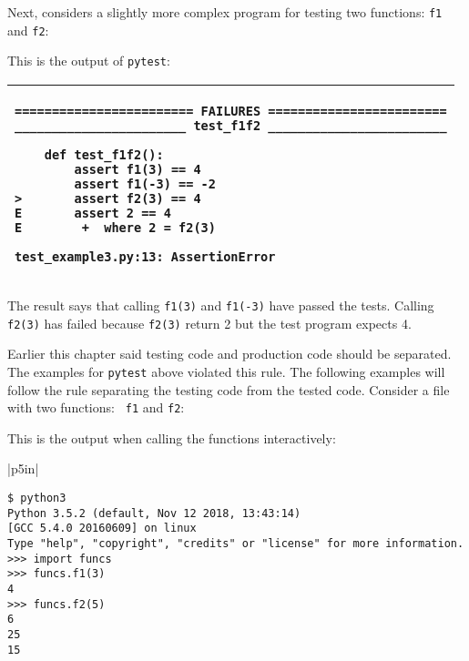 Next, considers a slightly more complex program for testing two
functions: {\tt f1} and {\tt f2}:

\resetlinenumber[1]
\linenumbers
\begin{tt}
  
\end{tt}
\nolinenumbers

This is the output of {\tt pytest}:

\vspace{0.2in}

\noindent
\begin{tabular}{|p{5in}|}\hline
\begin{verbatim}
======================== FAILURES ========================
_______________________ test_f1f2 ________________________

    def test_f1f2():
        assert f1(3) == 4
        assert f1(-3) == -2
>       assert f2(3) == 4
E       assert 2 == 4
E        +  where 2 = f2(3)

test_example3.py:13: AssertionError
\end{verbatim}
\\ \hline
\end{tabular}
\vspace{0.2in}

The result says that calling {\tt f1(3)} and {\tt f1(-3)} have passed
the tests. Calling {\tt f2(3)} has failed because {\tt f2(3)}
return 2 but the test program expects 4.

Earlier this chapter said testing code and production code should be
separated. The examples for {\tt pytest} above violated this rule.
The following examples will follow the rule separating the testing
code from the tested code. Consider a file with two functions: {\tt
  f1} and {\tt f2}:

\resetlinenumber[1]
\linenumbers
\begin{tt}
  
\end{tt}
\nolinenumbers

This is the output when calling the functions interactively:

\vspace{0.2in}

\noindent
\begin{tabular}{|p{5in}|}\hline
\begin{verbatim}
$ python3
Python 3.5.2 (default, Nov 12 2018, 13:43:14) 
[GCC 5.4.0 20160609] on linux
Type "help", "copyright", "credits" or "license" for more information.
>>> import funcs
>>> funcs.f1(3)
4
>>> funcs.f2(5)
6
25
15
\end{verbatim}
\\ \hline
\end{tabular}
\vspace{0.2in}

